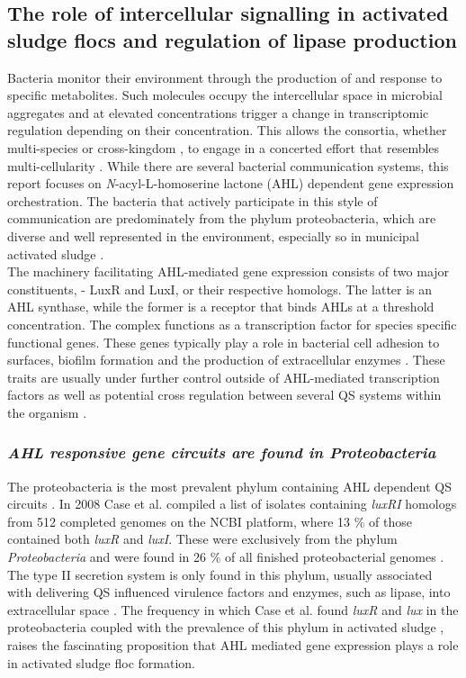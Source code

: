 \documentclass[11pt]{article}
\begin{document}
\subsection{The role of intercellular signalling in activated sludge flocs and regulation of lipase production}
Bacteria monitor their environment through the production of and response to specific metabolites. Such molecules occupy the intercellular space in microbial aggregates and at elevated concentrations trigger a change in transcriptomic regulation depending on their concentration. This allows the consortia, whether multi-species or cross-kingdom \citep{williams2007quorum}, to engage in a concerted effort that resembles multi-cellularity \cite{kjelleberg2002}. While there are several bacterial communication systems, this report focuses on \emph{N}-acyl-L-homoserine lactone (AHL) dependent gene expression orchestration. The bacteria that actively participate in this style of communication are predominately from the phylum proteobacteria, which are diverse and well represented in the environment, especially so in municipal activated sludge \cite{Hesham_11,Wagner_02}.  \\


The machinery facilitating AHL-mediated gene expression consists of two major constituents, - LuxR and LuxI, or their respective homologs. The latter is an AHL synthase, while the former is a receptor that binds AHLs at a threshold concentration. The complex functions as a transcription factor for species specific functional genes. These genes typically play a role in bacterial cell adhesion to surfaces, biofilm formation and the production of extracellular enzymes \cite{Flemming_10}.
These traits are usually under further control outside of AHL-mediated transcription factors as well as potential cross regulation between several QS systems within the organism \cite{juhas2005}.



\subsubsection{\emph{AHL responsive gene circuits are found in Proteobacteria}}
The proteobacteria is the most prevalent phylum containing AHL dependent QS circuits \cite{gelencser_12}. In 2008 Case et al. compiled a list of isolates containing \emph{luxRI} homologs from 512 completed genomes on the NCBI platform, where 13 \% of those contained both \emph{luxR} and \emph{luxI}. These were exclusively from the phylum \emph{Proteobacteria} and were found in 26 \% of all finished proteobacterial genomes \cite{case_08}.
The type II secretion system is only found in this phylum, usually associated with delivering QS influenced virulence factors and enzymes, such as lipase, into extracellular space \cite{sandkvist2001}. 
The frequency in which Case et al. found \emph{luxR} and \emph{lux} in the proteobacteria \cite{case_08} coupled with the prevalence of this phylum in activated sludge \cite{Wagner_02,Hesham_11}, raises the fascinating proposition that AHL mediated gene expression plays a role in activated sludge floc formation.
\end{document}
